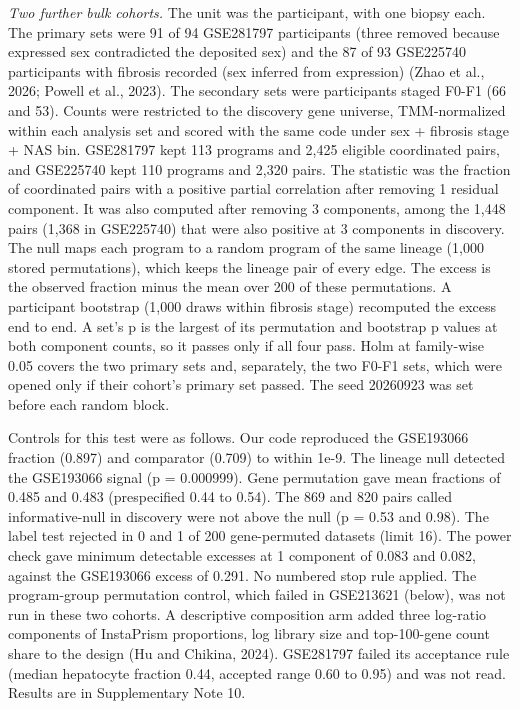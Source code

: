 \emph{Two further bulk cohorts.} The unit was the participant, with one biopsy each. The primary sets were 91 of 94 GSE281797 participants (three removed because expressed sex contradicted the deposited sex) and the 87 of 93 GSE225740 participants with fibrosis recorded (sex inferred from expression) (Zhao et al., 2026; Powell et al., 2023). The secondary sets were participants staged F0-F1 (66 and 53). Counts were restricted to the discovery gene universe, TMM-normalized within each analysis set and scored with the same code under sex + fibrosis stage + NAS bin. GSE281797 kept 113 programs and 2,425 eligible coordinated pairs, and GSE225740 kept 110 programs and 2,320 pairs. The statistic was the fraction of coordinated pairs with a positive partial correlation after removing 1 residual component. It was also computed after removing 3 components, among the 1,448 pairs (1,368 in GSE225740) that were also positive at 3 components in discovery. The null maps each program to a random program of the same lineage (1,000 stored permutations), which keeps the lineage pair of every edge. The excess is the observed fraction minus the mean over 200 of these permutations. A participant bootstrap (1,000 draws within fibrosis stage) recomputed the excess end to end. A set's p is the largest of its permutation and bootstrap p values at both component counts, so it passes only if all four pass. Holm at family-wise 0.05 covers the two primary sets and, separately, the two F0-F1 sets, which were opened only if their cohort's primary set passed. The seed 20260923 was set before each random block.

Controls for this test were as follows. Our code reproduced the GSE193066 fraction (0.897) and comparator (0.709) to within 1e-9. The lineage null detected the GSE193066 signal (p = 0.000999). Gene permutation gave mean fractions of 0.485 and 0.483 (prespecified 0.44 to 0.54). The 869 and 820 pairs called informative-null in discovery were not above the null (p = 0.53 and 0.98). The label test rejected in 0 and 1 of 200 gene-permuted datasets (limit 16). The power check gave minimum detectable excesses at 1 component of 0.083 and 0.082, against the GSE193066 excess of 0.291. No numbered stop rule applied. The program-group permutation control, which failed in GSE213621 (below), was not run in these two cohorts. A descriptive composition arm added three log-ratio components of InstaPrism proportions, log library size and top-100-gene count share to the design (Hu and Chikina, 2024). GSE281797 failed its acceptance rule (median hepatocyte fraction 0.44, accepted range 0.60 to 0.95) and was not read. Results are in Supplementary Note 10.

